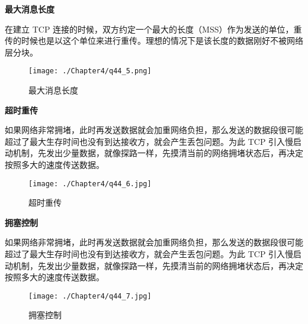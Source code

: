 \documentclass[cn,11pt,color=blue,lang=cn]{elegantbook}
\begin{document}
\begin{solution}
\begin{note} \textbf{最大消息长度} \end{note}
在建立 TCP 连接的时候，双方约定一个最大的长度（MSS）作为发送的单位，重传的时候也是以这个单位来进行重传。理想的情况下是该长度的数据刚好不被网络层分块。
\begin{figure}[htbp]
\centering
\texttt{[image: ./Chapter4/q44\_5.png]}
\caption{最大消息长度}
\label{fig44_5}
\end{figure}

\begin{note} \textbf{超时重传} \end{note}
如果网络非常拥堵，此时再发送数据就会加重网络负担，那么发送的数据段很可能超过了最大生存时间也没有到达接收方，就会产生丢包问题。为此 TCP 引入慢启动机制，先发出少量数据，就像探路一样，先摸清当前的网络拥堵状态后，再决定按照多大的速度传送数据。
\begin{figure}[htbp]
\centering
\texttt{[image: ./Chapter4/q44\_6.jpg]}
\caption{超时重传}
\label{fig44_6}
\end{figure}

\begin{note} \textbf{拥塞控制} \end{note}
如果网络非常拥堵，此时再发送数据就会加重网络负担，那么发送的数据段很可能超过了最大生存时间也没有到达接收方，就会产生丢包问题。为此 TCP 引入慢启动机制，先发出少量数据，就像探路一样，先摸清当前的网络拥堵状态后，再决定按照多大的速度传送数据。
\begin{figure}[htbp]
\centering
\texttt{[image: ./Chapter4/q44\_7.jpg]}
\caption{拥塞控制}
\label{fig44_7}
\end{figure}

\end{solution}
\end{document}
